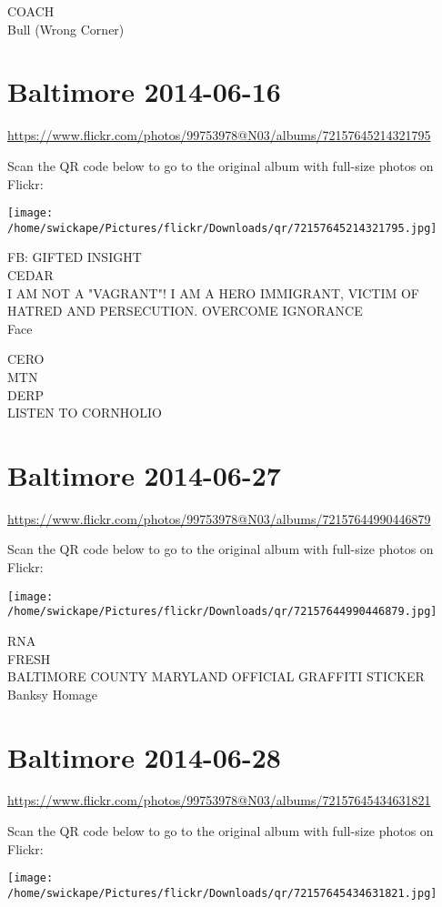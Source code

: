\documentclass[10pt,letterpaper]{article}
\begin{document}
COACH\\
Bull (Wrong Corner)


\section*{Baltimore 2014-06-16}

\url{https://www.flickr.com/photos/99753978@N03/albums/72157645214321795}

Scan the QR code below to go to the original album with full-size photos on Flickr:

\texttt{[image: /home/swickape/Pictures/flickr/Downloads/qr/72157645214321795.jpg]}


FB: GIFTED INSIGHT\\
CEDAR\\
I AM NOT A "VAGRANT"!  I AM A HERO IMMIGRANT, VICTIM OF HATRED AND PERSECUTION.  OVERCOME IGNORANCE\\
Face

CERO\\
MTN\\
DERP\\
LISTEN TO CORNHOLIO


\section*{Baltimore 2014-06-27}

\url{https://www.flickr.com/photos/99753978@N03/albums/72157644990446879}

Scan the QR code below to go to the original album with full-size photos on Flickr:

\texttt{[image: /home/swickape/Pictures/flickr/Downloads/qr/72157644990446879.jpg]}


RNA\\
FRESH\\
BALTIMORE COUNTY MARYLAND OFFICIAL GRAFFITI STICKER\\
Banksy Homage


\section*{Baltimore 2014-06-28}

\url{https://www.flickr.com/photos/99753978@N03/albums/72157645434631821}

Scan the QR code below to go to the original album with full-size photos on Flickr:

\texttt{[image: /home/swickape/Pictures/flickr/Downloads/qr/72157645434631821.jpg]}
\end{document}
